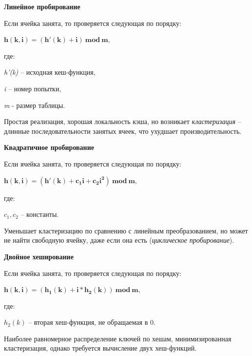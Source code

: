\begin{minipage}[t]{0.30\textwidth}
	\fontsize{8.5pt}{11pt}\selectfont
	\centerline{\small \textbf{Линейное пробирование}}\par

	Если ячейка занята, то проверяется следующая по порядку:\par
	\vspace{2pt}
	$\boldsymbol{h(k, i) = (h'(k) + i) \ mod \ m}$,\par
	\vspace{2pt}
	где:\par
	\textit{h'(k)} -- исходная кеш-функция,\par
	\textit{i} -- номер попытки,\par
	\textit{m} - размер таблицы.	

	\vspace{6pt}
	\hline
	\vspace{6pt}

	Простая реализация, хорошая локальность кэша, но возникает \textit{кластеризация} -- длинные последовательности занятых ячеек, что ухудшает производительность.
\end{minipage}
\hfill
\begin{minipage}[t]{0.30\textwidth}
	\fontsize{8.5pt}{11pt}\selectfont
	\centerline{\small \textbf{Квадратичное пробирование}}\par

	Если ячейка занята, то проверяется следующая по порядку:\par
	\vspace{2pt}
	$\boldsymbol{h(k, i) = (h'(k) +  c_{1}i + c_{2}i^{2}) \ mod \ m}$,\par
	\vspace{2pt}
	где:\par
	\textit{$c_{1}, c_{2}$} -- константы.

	\vspace{28pt}
	\hline
	\vspace{6pt}

	Уменьшает кластеризацию по сравнению с линейным преобразованием, но может не найти свободную ячейку, даже если она есть (\textit{циклическое пробирование}).
\end{minipage}
\hfill
\begin{minipage}[t]{0.30\textwidth}
	\fontsize{8.5pt}{11pt}\selectfont
	\centerline{\small \textbf{Двойное хеширование}}\par

	Если ячейка занята, то проверяется следующая по порядку:\par
	\vspace{2pt}
	$\boldsymbol{h(k, i) = (h_{1}(k) +  i*h_{2}(k)) \ mod \ m}$,\par
	\vspace{2pt}
	где:\par
	\textit{$h_{2}(k)$} -- вторая хеш-функция, не обращаемая в 0.

	\vspace{17pt}
	\hline
	\vspace{6pt}

	Наиболее равномерное распределение ключей по хешам, минимизированная кластеризация, однако требуется вычисление двух хеш-функций.
\end{minipage}
